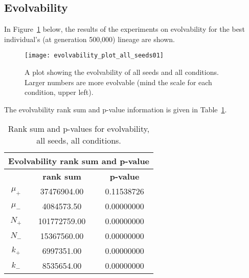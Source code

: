 \subsection{Evolvability}\label{res:evolvability}
In Figure~\ref{fig:evolvability_all_seeds} below, the results of the experiments on evolvability for the best individual's (at generation 500,000) lineage are shown. 
\begin{figure}[H]
	\centering
	\texttt{[image: evolvability\_plot\_all\_seeds01]}
	\caption[Evolvability plot, all seed]{A plot showing the evolvability of all seeds and all conditions. Larger numbers are more evolvable (mind the scale for each condition, upper left).}
	\label{fig:evolvability_all_seeds}	
\end{figure}

The evolvability rank sum and p-value information is given in Table~\ref{table:evolvability-rank_sum_and_p-values}.

\begin{table}[H]
	\begin{tabular}{|c|c|c|}
		\hline
		\multicolumn{3}{c}{\Large \textbf{Evolvability rank sum and p-value}} \\
		\hline
		& \textbf{rank sum} & \textbf{p-value} \\
		\hline
		$\mu_+$ & 37476904.00 & 0.11538726 \\ 
		\hline
		$\mu_-$ & 4084573.50 & 0.00000000 \\ 
		\hline
		$N_+$ & 101772759.00 & 0.00000000 \\ 
		\hline
		$N_-$ & 15367560.00 & 0.00000000 \\ 
		\hline
		$k_+$ & 6997351.00 & 0.00000000 \\ 
		\hline
		$k_-$ & 8535654.00 & 0.00000000 \\ 
		\hline
	\end{tabular}
	\caption[Evolvability - rank sum and p-value]{Rank sum and p-values for evolvability, all seeds, all conditions.}
	\label{table:evolvability-rank_sum_and_p-values}
\end{table}

